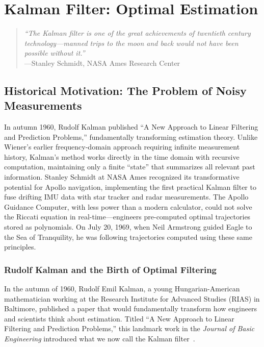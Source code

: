
\chapter{Kalman Filter: Optimal Estimation}
\label{ch:kalman_filter}

\begin{quote}
\textit{``The Kalman filter is one of the great achievements of twentieth century technology---manned trips to the moon and back would not have been possible without it.''}\\
---Stanley Schmidt, NASA Ames Research Center
\end{quote}

\section{Historical Motivation: The Problem of Noisy Measurements}

\begin{historicalbox}
In autumn 1960, Rudolf Kalman published ``A New Approach to Linear Filtering and Prediction Problems,'' fundamentally transforming estimation theory. Unlike Wiener's earlier frequency-domain approach requiring infinite measurement history, Kalman's method works directly in the time domain with recursive computation, maintaining only a finite ``state'' that summarizes all relevant past information. Stanley Schmidt at NASA Ames recognized its transformative potential for Apollo navigation, implementing the first practical Kalman filter to fuse drifting IMU data with star tracker and radar measurements. The Apollo Guidance Computer, with less power than a modern calculator, could not solve the Riccati equation in real-time---engineers pre-computed optimal trajectories stored as polynomials. On July 20, 1969, when Neil Armstrong guided Eagle to the Sea of Tranquility, he was following trajectories computed using these same principles.
\end{historicalbox}

\subsection{Rudolf Kalman and the Birth of Optimal Filtering}

In the autumn of 1960, Rudolf Emil Kalman, a young Hungarian-American mathematician working at the Research Institute for Advanced Studies (RIAS) in Baltimore, published a paper that would fundamentally transform how engineers and scientists think about estimation. Titled ``A New Approach to Linear Filtering and Prediction Problems,'' this landmark work in the \textit{Journal of Basic Engineering} introduced what we now call the Kalman filter~\cite{kalman1960}.

